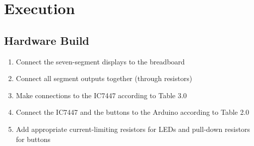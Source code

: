\section{Execution}
\subsection{Hardware Build}
\begin{enumerate}
    \item Connect the seven-segment displays to the breadboard
    \item Connect all segment outputs together (through resistors)
    \item Make connections to the IC7447 according to Table 3.0
    \item Connect the IC7447 and the buttons to the Arduino according to Table 2.0
    \item Add appropriate current-limiting resistors for LEDs and pull-down resistors for buttons
\end{enumerate}

